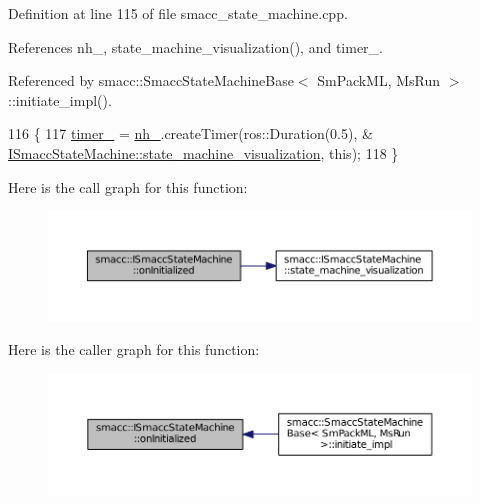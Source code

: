 Definition at line 115 of file smacc\+\_\+state\+\_\+machine.\+cpp.



References nh\+\_\+, state\+\_\+machine\+\_\+visualization(), and timer\+\_\+.



Referenced by smacc\+::\+Smacc\+State\+Machine\+Base$<$ Sm\+Pack\+M\+L, Ms\+Run $>$\+::initiate\+\_\+impl().


\begin{DoxyCode}
116 \{
117     \hyperlink{classsmacc_1_1ISmaccStateMachine_ab6b00dc92aa86f1074d795fb4057e5bc}{timer\_} = \hyperlink{classsmacc_1_1ISmaccStateMachine_ad8877bcca9dbb345fe72cca839c93dd3}{nh\_}.createTimer(ros::Duration(0.5), &
      \hyperlink{classsmacc_1_1ISmaccStateMachine_ac03029f770422d0ea77ea9856b8cb1a8}{ISmaccStateMachine::state\_machine\_visualization}, \textcolor{keyword}{this});
118 \}
\end{DoxyCode}


Here is the call graph for this function\+:
\nopagebreak
\begin{figure}[H]
\begin{center}
\leavevmode
\includegraphics[width=350pt]{classsmacc_1_1ISmaccStateMachine_a95e7f71d0d88fffd0afebb1f9ccdade5_cgraph}
\end{center}
\end{figure}




Here is the caller graph for this function\+:
\nopagebreak
\begin{figure}[H]
\begin{center}
\leavevmode
\includegraphics[width=350pt]{classsmacc_1_1ISmaccStateMachine_a95e7f71d0d88fffd0afebb1f9ccdade5_icgraph}
\end{center}
\end{figure}


